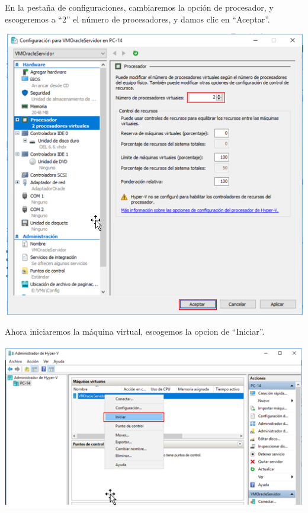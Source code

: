 En la pestaña de configuraciones, cambiaremos la opción de procesador, y escogeremos a “2” el número de procesadores, y damos clic en “Aceptar”. 
	\begin{center}
		\includegraphics[width=14cm]{./Imagenes/24} 
	\end{center} 

\vspace{\baselineskip}

Ahora iniciaremos la máquina virtual, escogemos la opcion de “Iniciar”. 
	\begin{center}
		\includegraphics[width=14cm]{./Imagenes/25} 
	\end{center} 

\vspace{\baselineskip}

